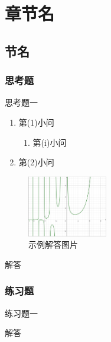 \documentclass[cn,chinese,founder]{elegantbook}
\begin{document}
    \chapter{章节名}
        \section{节名}
            \subsection{思考题}
            \begin{example}
                思考题一
                \begin{enumerate}
                    \item 第(1)小问
                    \begin{enumerate}
                        \item 第(i)小问
                    \end{enumerate}
                    \item 第(2)小问
                \end{enumerate}
            \end{example}
            \begin{figure}
                \vspace{-1.5cm}
                \includegraphics[width=3.5cm]{example.png}
                \caption[示例]{示例解答图片}
            \end{figure}
            \begin{solution}
                解答
            \end{solution}
            
            \subsection{练习题}
            \begin{exercise}
                练习题一
            \end{exercise}
            \begin{solution}
                解答
            \end{solution}
\end{document}
